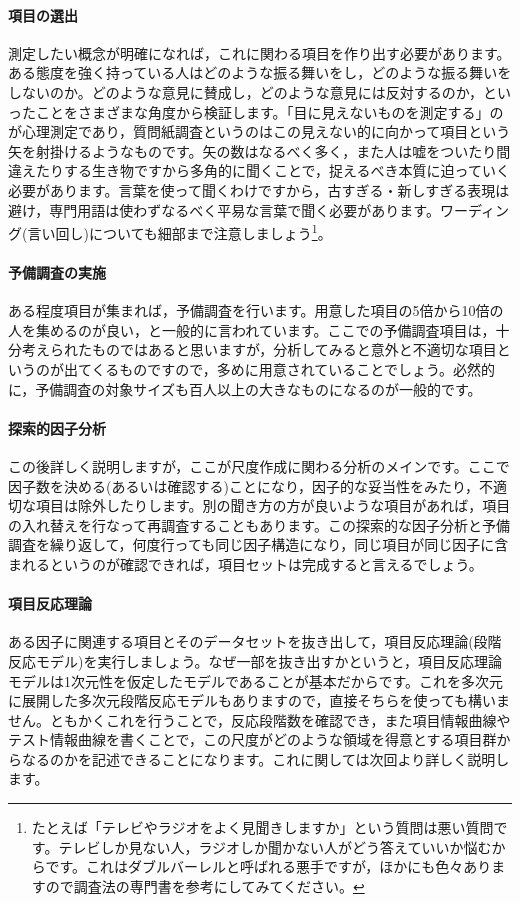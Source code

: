 \documentclass{ltjsbook}
\begin{document}
\paragraph{項目の選出}測定したい概念が明確になれば，これに関わる項目を作り出す必要があります。ある態度を強く持っている人はどのような振る舞いをし，どのような振る舞いをしないのか。どのような意見に賛成し，どのような意見には反対するのか，といったことをさまざまな角度から検証します。「目に見えないものを測定する」のが心理測定であり，質問紙調査というのはこの見えない的に向かって項目という矢を射掛けるようなものです。矢の数はなるべく多く，また人は嘘をついたり間違えたりする生き物ですから多角的に聞くことで，捉えるべき本質に迫っていく必要があります。言葉を使って聞くわけですから，古すぎる・新しすぎる表現は避け，専門用語は使わずなるべく平易な言葉で聞く必要があります。ワーディング(言い回し)についても細部まで注意しましょう\footnote{たとえば「テレビやラジオをよく見聞きしますか」という質問は悪い質問です。テレビしか見ない人，ラジオしか聞かない人がどう答えていいか悩むからです。これはダブルバーレルと呼ばれる悪手ですが，ほかにも色々ありますので調査法の専門書を参考にしてみてください。}。

\paragraph{予備調査の実施}ある程度項目が集まれば，予備調査を行います。用意した項目の5倍から10倍の人を集めるのが良い，と一般的に言われています\textcite{kosugi2016a}。ここでの予備調査項目は，十分考えられたものではあると思いますが，分析してみると意外と不適切な項目というのが出てくるものですので，多めに用意されていることでしょう。必然的に，予備調査の対象サイズも百人以上の大きなものになるのが一般的です。

\paragraph{探索的因子分析}この後詳しく説明しますが，ここが尺度作成に関わる分析のメインです。ここで因子数を決める(あるいは確認する)ことになり，因子的な妥当性をみたり，不適切な項目は除外したりします。別の聞き方の方が良いような項目があれば，項目の入れ替えを行なって再調査することもあります。この探索的な因子分析と予備調査を繰り返して，何度行っても同じ因子構造になり，同じ項目が同じ因子に含まれるというのが確認できれば，項目セットは完成すると言えるでしょう。

\paragraph{項目反応理論}ある因子に関連する項目とそのデータセットを抜き出して，項目反応理論(段階反応モデル)を実行しましょう。なぜ一部を抜き出すかというと，項目反応理論モデルは1次元性を仮定したモデルであることが基本だからです。これを多次元に展開した多次元段階反応モデルもありますので，直接そちらを使っても構いません。ともかくこれを行うことで，反応段階数を確認でき，また項目情報曲線やテスト情報曲線を書くことで，この尺度がどのような領域を得意とする項目群からなるのかを記述できることになります。これに関しては次回より詳しく説明します。
\end{document}
